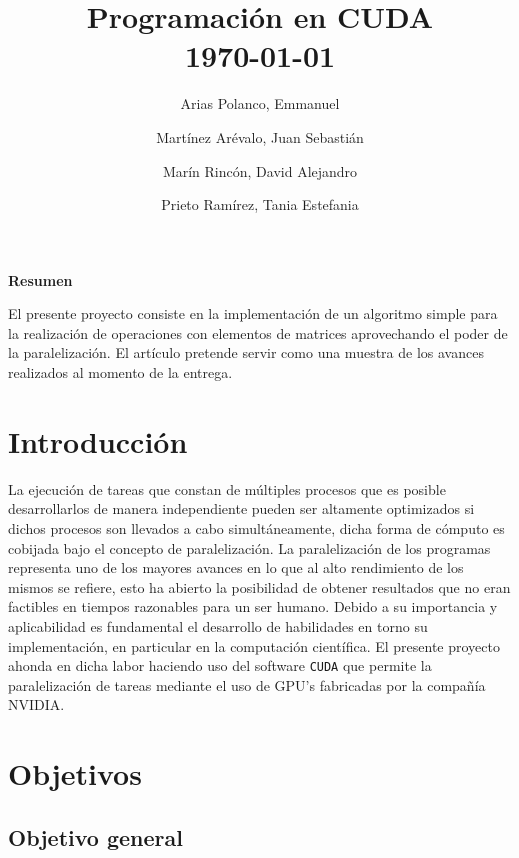 \documentclass[journal, onecolumn, a4paper, 11pt]{IEEEtran}
\title{\textbf{Programación en CUDA} \\\vspace*{10pt} \normalsize  \today{}}
\author[1]{Arias Polanco, Emmanuel}
\author[1]{Martínez Arévalo, Juan Sebastián}
\author[1]{Marín Rincón, David Alejandro}
\author[1]{Prieto Ramírez, Tania Estefania}
\affil[1]{Departamento de Física, Universidad Nacional de Colombia, Bogotá D.C., Colombia}
\begin{document}
    \renewcommand{\theequation}{eq. \thesection.\arabic{equation}}
    \renewcommand{\thefigure}{ \thesection.\arabic{figure}}
    \renewcommand{\thetable}{\thesection.\arabic{table}}
    \renewcommand{\thesubsection}{\thesection.\arabic{subsection}}
    \renewcommand{\thesection}{\arabic{section}}


\maketitle

\begin{center}
    \textcolor{colorino}{\textbf{Resumen}}
\end{center}

El presente proyecto consiste en la implementación de un algoritmo simple para la realización de operaciones con elementos de matrices aprovechando el poder de la paralelización. El artículo pretende servir como una muestra de los avances realizados al momento de la entrega.

\section{\textbf{Introducción}}

La ejecución de tareas que constan de múltiples procesos que es posible desarrollarlos de manera independiente pueden ser altamente optimizados si dichos procesos son llevados a cabo simultáneamente, dicha forma de cómputo es cobijada bajo el concepto de paralelización. La paralelización de los programas representa uno de los mayores avances en lo que al alto rendimiento de los mismos se refiere, esto ha abierto la posibilidad de obtener resultados que no eran factibles en tiempos razonables para un ser humano. Debido a su importancia y aplicabilidad es fundamental el desarrollo de habilidades en torno su implementación, en particular en la computación científica. El presente proyecto ahonda en dicha labor haciendo uso del software \texttt{CUDA} que permite la paralelización de tareas mediante el uso de GPU's fabricadas por la compañía NVIDIA.

\section{\textbf{Objetivos}}

\subsection{\textbf{Objetivo general}}
\end{document}
